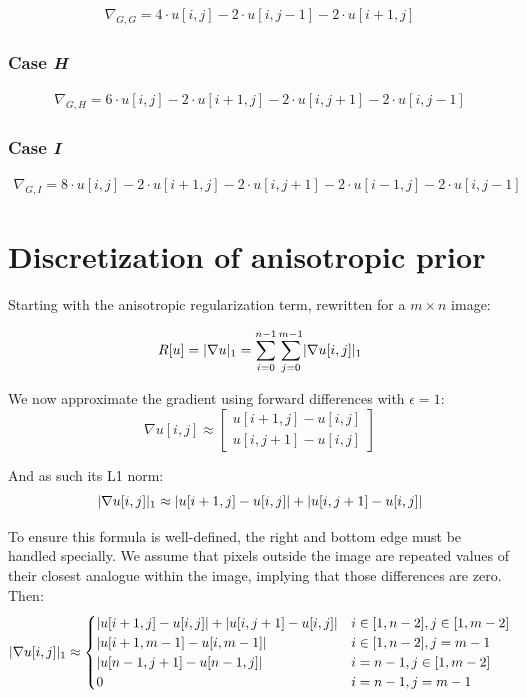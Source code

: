\documentclass[a4paper]{scrreprt}
\DeclarePairedDelimiter\abs{\lvert}{\rvert}
\begin{document}
\begin{align*}
		\nabla_{G, G} = 
		  4 \cdot u[i, j] - 2 \cdot u[i, j - 1] - 2 \cdot u[i + 1, j]
\end{align*}

\subsubsection{Case \emph{H}}

\begin{align*}
		\nabla_{G, H} =
		  6 \cdot u[i, j] - 2 \cdot u[i + 1, j] - 2 \cdot u[i, j + 1] - 2 \cdot u[i, j - 1]
\end{align*}

\subsubsection{Case \emph{I}}

\begin{align*}
		\nabla_{G, I} =
		  8 \cdot u[i, j] - 2 \cdot u[i + 1, j] - 2 \cdot u[i, j + 1] - 2 \cdot u[i - 1, j] - 2 \cdot u[i, j - 1]
\end{align*}


\section{Discretization of anisotropic prior}

Starting with the anisotropic regularization term, rewritten for a $m \times n$
image:

\[
		R[u] = \abs{\nabla u}_1 = \sum_{i = 0}^{n - 1} \sum_{j = 0}^{m - 1} \abs{\nabla u[i, j]}_1
\]

We now approximate the gradient using forward differences with $\epsilon = 1$:
\[
		\nabla u[i, j] \approx \begin{bmatrix}
				u[i + 1, j] - u[i, j] \\
				u[i, j + 1] - u[i, j]
		\end{bmatrix}
\]

And as such its L1 norm:
\[
		\abs{\nabla u[i, j]}_1 \approx \abs{u[i + 1, j] - u[i, j]} + \abs{u[i, j + 1] - u[i, j]}
\]

To ensure this formula is well-defined, the right and bottom edge must be
handled specially. We assume that pixels outside the image are repeated values
of their closest analogue within the image, implying that those differences are
zero. Then:
\begin{align*}
		\abs{\nabla u[i, j]}_1 \approx \begin{cases}
				\abs{u[i + 1, j] - u[i, j]} + \abs{u[i, j + 1] - u[i, j]} & i \in [1, n - 2], j \in [1, m - 2] \\
				\abs{u[i + 1, m - 1] - u[i, m - 1]} & i \in [1, n - 2], j = m - 1 \\
				\abs{u[n - 1, j + 1] - u[n - 1, j]} & i = n - 1, j \in [1, m - 2] \\
				0 & i = n - 1, j = m - 1
		\end{cases}
\end{align*}
\end{document}
